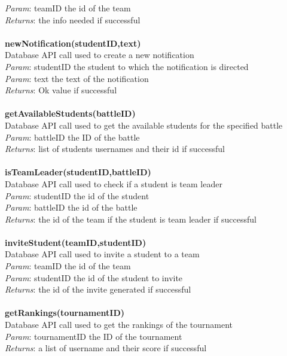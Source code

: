 \documentclass{article}
\begin{document}
\textit{Param}: teamID the id of the team\\
\textit{Returns}: the info needed if successful\\
\\
\textbf{newNotification(studentID,text)}\\
Database API call used to create a new notification\\
\textit{Param}: studentID the student to which the notification is directed\\
\textit{Param}: text the text of the notification\\
\textit{Returns}: Ok value if successful\\
\\
\textbf{getAvailableStudents(battleID)}\\
Database API call used to get the available students for the specified battle\\
\textit{Param}: battleID the ID of the battle\\
\textit{Returns}: list of students usernames and their id if successful\\
\\
\textbf{isTeamLeader(studentID,battleID)}\\
Database API call used to check if a student is team leader\\
\textit{Param}: studentID the id of the student\\
\textit{Param}: battleID the id of the battle\\
\textit{Returns}: the id of the team if the student is team leader if successful\\
\\
\textbf{inviteStudent(teamID,studentID)}\\
Database API call used to invite a student to a team\\
\textit{Param}: teamID the id of the team\\
\textit{Param}: studentID the id of the student to invite\\
\textit{Returns}: the id of the invite generated if successful\\
\\
\textbf{getRankings(tournamentID)}\\
Database API call used to get the rankings of the tournament\\
\textit{Param}: tournamentID the ID of the tournament\\
\textit{Returns}: a list of username and their score if successful\\
\end{document}
